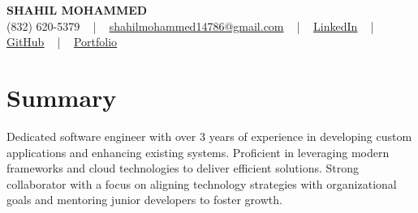 \documentclass[letterpaper,10pt]{article}
\begin{document}
\begin{center}
    {\fontsize{14pt}{12pt}\selectfont \textbf{\MakeUppercase{Shahil Mohammed}}}\\ \vspace{2pt}
    \fontsize{10pt}{12pt}\selectfont (832) 620-5379 ~ | ~ \href{mailto:shahilmohammed14786@gmail.com}{shahilmohammed14786@gmail.com} ~ | ~  
    \href{https://www.linkedin.com/in/shahil-mohammed-9652931a1/}{\color{blue}\underline{LinkedIn}}  ~ | ~ 
    \href{https://github.com/freakbeast14}{\color{blue}\underline{GitHub}} ~ | ~ 
    \href{https://shahil-mohammed.netlify.app/}{\color{blue}\underline{Portfolio}}
    \vspace{-8pt}
\end{center}

\section{Summary}
\vspace{-2pt}\fontsize{8pt}{9pt}\selectfont
Dedicated software engineer with over 3 years of experience in developing custom applications and enhancing existing systems. Proficient in leveraging modern frameworks and cloud technologies to deliver efficient solutions. Strong collaborator with a focus on aligning technology strategies with organizational goals and mentoring junior developers to foster growth.
\vspace{-5pt}
 
\vspace{-2pt}
\end{document}
